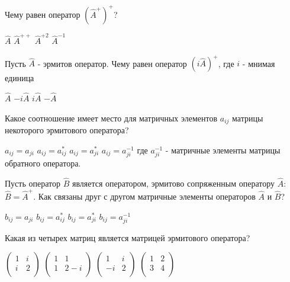 \documentclass[11pt,a4paper]{exam}
\begin{document}
\begin{questions}
\question Чему равен оператор ${{\left( {{{\hat{A}}}^{+}} \right)}^{+}}$?
\begin{choices}
\choice $\hat{A}$    
\choice ${{\hat{A}}^{++}}$    
\choice ${{\hat{A}}^{+2}}$    
\choice ${{\hat{A}}^{-1}}$
\end{choices}

\question Пусть $\hat{A}$ - эрмитов оператор. Чему равен оператор ${{\left( i\hat{A} \right)}^{+}}$, где $i$ - мнимая единица
\begin{choices}
\choice $\hat{A}$       
\choice $-i\hat{A}$        
\choice $i\hat{A}$         
\choice $-\hat{A}$ 
\end{choices}

\question Какое соотношение имеет место для матричных элементов ${{a}_{ij}}$ матрицы некоторого эрмитового оператора?
\begin{choices}
\choice ${{a}_{ij}}={{a}_{ji}}$  
\choice ${{a}_{ij}}=a_{ij}^{*}$  
\choice ${{a}_{ij}}=a_{ji}^{*}$  
\choice ${{a}_{ij}}=a_{ji}^{-1}$
где $a_{ji}^{-1}$ - матричные элементы матрицы обратного оператора.
\end{choices}

\question Пусть оператор $\hat{B}$ является оператором, эрмитово сопряженным оператору $\hat{A}$: $\hat{B}={{\hat{A}}^{+}}$. Как связаны друг с другом матричные элементы операторов $\hat{A}$ и $\hat{B}$?
\begin{choices}
\choice ${{b}_{ij}}={{a}_{ji}}$  
\choice ${{b}_{ij}}=a_{ij}^{*}$  
\choice ${{b}_{ij}}=a_{ji}^{*}$  
\choice ${{b}_{ij}}=a_{ji}^{-1}$
\end{choices}

\question Какая из четырех матриц является матрицей эрмитового оператора?
\begin{choices}
\choice $\left( \begin{matrix}
   1 & i  \\
   i & 2  \\
\end{matrix} \right)$      
\choice $\left( \begin{matrix}
   1 & 1  \\
   1 & 2-i  \\
\end{matrix} \right)$      
\choice $\left( \begin{matrix}
   1 & i  \\
   -i & 2  \\
\end{matrix} \right)$      
\choice $\left( \begin{matrix}
   1 & 2  \\
   3 & 4  \\
\end{matrix} \right)$
\end{choices}


\end{questions}
\end{document}
